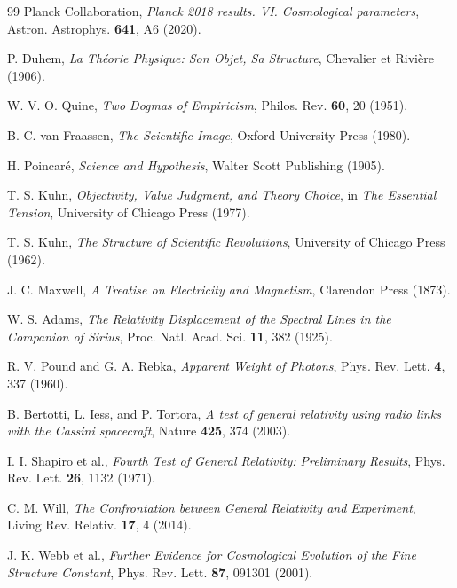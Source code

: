 \begin{thebibliography}{99}
		Planck Collaboration, \textit{Planck 2018 results. VI. Cosmological parameters}, Astron. Astrophys. \textbf{641}, A6 (2020).
		
		P. Duhem, \textit{La Théorie Physique: Son Objet, Sa Structure}, Chevalier et Rivière (1906).
		
		W. V. O. Quine, \textit{Two Dogmas of Empiricism}, Philos. Rev. \textbf{60}, 20 (1951).
		
		B. C. van Fraassen, \textit{The Scientific Image}, Oxford University Press (1980).
		
		H. Poincaré, \textit{Science and Hypothesis}, Walter Scott Publishing (1905).
		
		T. S. Kuhn, \textit{Objectivity, Value Judgment, and Theory Choice}, in \textit{The Essential Tension}, University of Chicago Press (1977).
		
		T. S. Kuhn, \textit{The Structure of Scientific Revolutions}, University of Chicago Press (1962).
		
		J. C. Maxwell, \textit{A Treatise on Electricity and Magnetism}, Clarendon Press (1873).
		
		W. S. Adams, \textit{The Relativity Displacement of the Spectral Lines in the Companion of Sirius}, Proc. Natl. Acad. Sci. \textbf{11}, 382 (1925).
		
		R. V. Pound and G. A. Rebka, \textit{Apparent Weight of Photons}, Phys. Rev. Lett. \textbf{4}, 337 (1960).
		
		B. Bertotti, L. Iess, and P. Tortora, \textit{A test of general relativity using radio links with the Cassini spacecraft}, Nature \textbf{425}, 374 (2003).
		
		I. I. Shapiro et al., \textit{Fourth Test of General Relativity: Preliminary Results}, Phys. Rev. Lett. \textbf{26}, 1132 (1971).
		
		C. M. Will, \textit{The Confrontation between General Relativity and Experiment}, Living Rev. Relativ. \textbf{17}, 4 (2014).
		
		J. K. Webb et al., \textit{Further Evidence for Cosmological Evolution of the Fine Structure Constant}, Phys. Rev. Lett. \textbf{87}, 091301 (2001).
		

\end{thebibliography}
